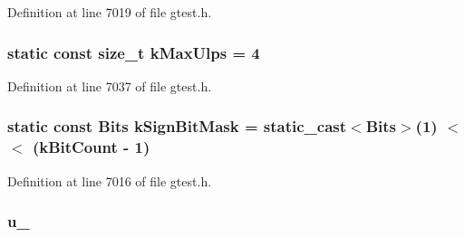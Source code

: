 \-Definition at line 7019 of file gtest.\-h.

\hypertarget{classtesting_1_1internal_1_1FloatingPoint_a4ae32dc6024bafe312ff4612feb67719}{
\subsubsection[{k\-Max\-Ulps}]{\setlength{\rightskip}{0pt plus 5cm}static const size\-\_\-t {\bf k\-Max\-Ulps} = 4}}\label{dd/d0f/classtesting_1_1internal_1_1FloatingPoint_a4ae32dc6024bafe312ff4612feb67719}


\-Definition at line 7037 of file gtest.\-h.

\hypertarget{classtesting_1_1internal_1_1FloatingPoint_abff12c87d8b1aad815b4fc0619deb0f5}{
\subsubsection[{k\-Sign\-Bit\-Mask}]{\setlength{\rightskip}{0pt plus 5cm}static const {\bf \-Bits} {\bf k\-Sign\-Bit\-Mask} = static\-\_\-cast$<${\bf \-Bits}$>$(1) $<$$<$ ({\bf k\-Bit\-Count} -\/ 1)}}\label{dd/d0f/classtesting_1_1internal_1_1FloatingPoint_abff12c87d8b1aad815b4fc0619deb0f5}


\-Definition at line 7016 of file gtest.\-h.

\hypertarget{classtesting_1_1internal_1_1FloatingPoint_a7ba7d6be838cfc2c8bbdc327f5016d83}{
\subsubsection[{u\-\_\-}]{ {\bf u\-\_\-}}}\label{dd/d0f/classtesting_1_1internal_1_1FloatingPoint_a7ba7d6be838cfc2c8bbdc327f5016d83}



